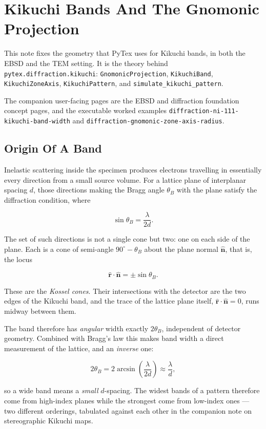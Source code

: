 \section{Kikuchi Bands And The Gnomonic Projection}

This note fixes the geometry that PyTex uses for Kikuchi bands, in both the EBSD
and the TEM setting. It is the theory behind
\texttt{pytex.diffraction.kikuchi}: \texttt{GnomonicProjection},
\texttt{KikuchiBand}, \texttt{KikuchiZoneAxis}, \texttt{KikuchiPattern}, and
\texttt{simulate\_kikuchi\_pattern}.

The companion user-facing pages are the EBSD and diffraction foundation concept
pages, and the executable worked examples
\texttt{diffraction-ni-111-kikuchi-band-width} and
\texttt{diffraction-gnomonic-zone-axis-radius}.

\subsection{Origin Of A Band}

Inelastic scattering inside the specimen produces electrons travelling in
essentially every direction from a small source volume. For a lattice plane of
interplanar spacing $d$, those directions making the Bragg angle $\theta_B$ with
the plane satisfy the diffraction condition, where

\[
  \sin\theta_B = \frac{\lambda}{2 d}.
\]

The set of such directions is not a single cone but two: one on each side of the
plane. Each is a cone of semi-angle $90^\circ - \theta_B$ about the plane normal
$\hat{\mathbf{n}}$, that is, the locus

\[
  \hat{\mathbf{r}} \cdot \hat{\mathbf{n}} = \pm \sin\theta_B .
\]

These are the \emph{Kossel cones}. Their intersections with the detector are the
two edges of the Kikuchi band, and the trace of the lattice plane itself,
$\hat{\mathbf{r}} \cdot \hat{\mathbf{n}} = 0$, runs midway between them.

The band therefore has \emph{angular} width exactly $2\theta_B$, independent of
detector geometry. Combined with Bragg's law this makes band width a direct
measurement of the lattice, and an \emph{inverse} one:

\[
  2\theta_B = 2\arcsin\!\left(\frac{\lambda}{2d}\right) \approx \frac{\lambda}{d},
\]

so a wide band means a \emph{small} $d$-spacing. The widest bands of a pattern
therefore come from high-index planes while the strongest come from low-index
ones --- two different orderings, tabulated against each other in the companion
note on stereographic Kikuchi maps.

